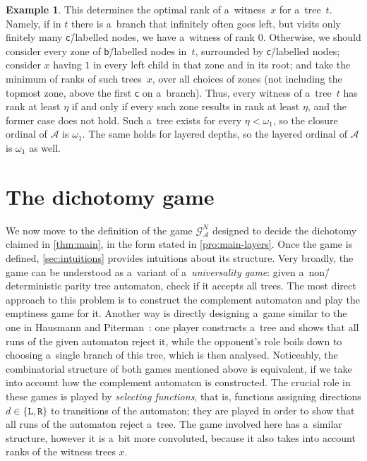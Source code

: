 \documentclass[11pt,a4paper]{amsart}
\theoremstyle{plain}
\theoremstyle{definition}
\newtheorem{exa}[thm]{Example}
\theoremstyle{defC}
\theoremstyle{thmC}
\theoremstyle{plain}
\numberwithin{equation}{section}
\numberwithin{equation}{section}
\numberwithin{figure}{section}
\newcommand{\mathcalsym}[1]{\ensuremath{\mathcal{#1}}\xspace}
\newcommand{\CA}{\mathcalsym{A}}
\newcommand{\CG}{\mathcalsym{G}}
\newcommand{\dL}{\mathtt{{\scriptstyle L}}}
\newcommand{\dR}{\mathtt{{\scriptstyle R}}}
\begin{document}
\begin{exa}
	This determines the optimal rank of a~witness~$x$ for a~tree~$t$.
	Namely, if in $t$ there is a~branch that infinitely often goes left, but visits only finitely many $\mathsf{c}$\=/labelled nodes, we have a~witness of rank $0$.
	Otherwise, we should consider every zone of $\mathsf{b}$\=/labelled nodes in~$t$, surrounded by $\mathsf{c}$\=/labelled nodes;
	consider $x$ having $1$ in every left child in that zone and in its root; and take the minimum of ranks of such trees~$x$, over all choices of zones
	(not including the topmost zone, above the first $\mathsf{c}$ on a~branch).
	Thus, every witness of a~tree~$t$ has rank at least $\eta$ if and only if every such zone results in rank at least $\eta$, and the former case does not hold.
	Such a~tree exists for every $\eta<\omega_1$, so the closure ordinal of $\CA$ is $\omega_1$.
	The same holds for layered depths, so the layered ordinal of $\CA$ is $\omega_1$ as well.
\end{exa}



\section{The dichotomy game}

We now move to the definition of the game $\CG^N_\CA$ designed to decide the dichotomy claimed in \cref{thm:main}, in the form stated in \cref{pro:main-layers}.
Once the game is defined, \cref{sec:intuitions} provides intuitions about its structure.
Very broadly, the game can be understood as a~variant of a~\emph{universality game}: given a~non\=/deterministic parity tree automaton, check if it accepts all trees.
The most direct approach to this problem is to construct the complement automaton and play the emptiness game for it.
Another way is directly designing a~game similar to the one in Hausmann and Piterman~\cite[Section~4.2]{Hausmann2022}:
one player constructs a~tree and shows that all runs of the given automaton reject it, while the opponent's role boils down to choosing a~single branch of this tree, which is then analysed.
Noticeably, the combinatorial structure of both games mentioned above is equivalent, if we take into account how the complement automaton is constructed.
The crucial role in these games is played by \emph{selecting functions}, that is, functions assigning directions $d\in\{\dL,\dR\}$ to transitions of the automaton;
they are played in order to show that all runs of the automaton reject a~tree.
The game involved here has a~similar structure, however it is a~bit more convoluted, because it also takes into account ranks of the witness trees $x$.
\end{document}
